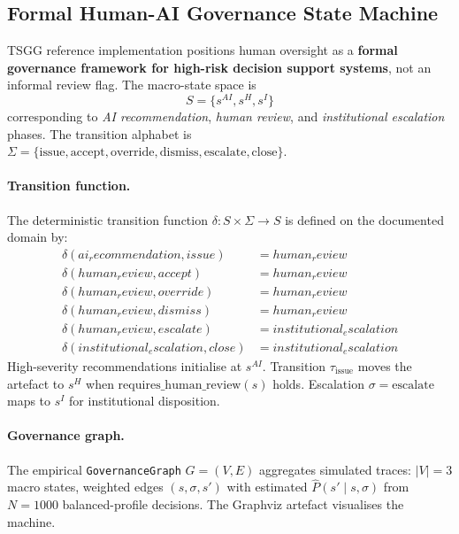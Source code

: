 \subsection{Formal Human-AI Governance State Machine}
\label{sec:formal-governance-model}

TSGG reference implementation positions human oversight as a \textbf{formal governance framework for high-risk
decision support systems}, not an informal review flag. The macro-state space is
\begin{equation*}
  S = \{s^{AI}, s^{H}, s^{I}\}
\end{equation*}
corresponding to \emph{AI recommendation}, \emph{human review}, and
\emph{institutional escalation} phases. The transition alphabet is
$\Sigma = \{\mathrm{issue}, \mathrm{accept}, \mathrm{override}, \mathrm{dismiss},
\mathrm{escalate}, \mathrm{close}\}$.

\paragraph{Transition function.}
The deterministic transition function $\delta: S \times \Sigma \rightarrow S$ is
defined on the documented domain by:
\begin{align*}
  \delta(\mathit{ai_recommendation}, \mathit{issue}) &= \mathit{human_review} \\
  \delta(\mathit{human_review}, \mathit{accept}) &= \mathit{human_review} \\
  \delta(\mathit{human_review}, \mathit{override}) &= \mathit{human_review} \\
  \delta(\mathit{human_review}, \mathit{dismiss}) &= \mathit{human_review} \\
  \delta(\mathit{human_review}, \mathit{escalate}) &= \mathit{institutional_escalation} \\
  \delta(\mathit{institutional_escalation}, \mathit{close}) &= \mathit{institutional_escalation}
\end{align*}
High-severity recommendations initialise at $s^{AI}$.
Transition $\tau_{\mathrm{issue}}$ moves the artefact to $s^{H}$ when
$\mathrm{requires\_human\_review}(s)$ holds.
Escalation $\sigma=\mathrm{escalate}$ maps to $s^{I}$ for institutional disposition.

\paragraph{Governance graph.}
The empirical \texttt{GovernanceGraph} $G=(V,E)$ aggregates simulated traces:
$|V|=3$ macro states, weighted edges $(s,\sigma,s')$ with estimated
$\hat{P}(s' \mid s,\sigma)$ from $N=1000$ balanced-profile decisions.
The Graphviz artefact 
visualises the machine.


